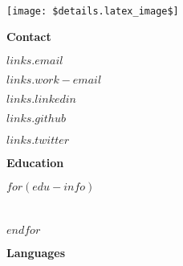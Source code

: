 \documentclass{article}
\begin{document}
    \begin{multicols}{2}
        \begin{center}
            \normalfont
            \pagecolor{maincontent}
            \vspace{12mm}
            {\huge {}}
            \vspace{10mm}\\
            \texttt{[image: \$details.latex\_image\$]} \\
        \end{center}
            \vspace{10mm}
            {\Large {\color{header}\textbf{Contact}}}
            
            \vspace{3mm}
            \textcolor{secondary}{$links.email$}
            \vspace{2mm}
            
            \textcolor{secondary}{$links.work-email$}
            \vspace{2mm}

            \textcolor{secondary}{\href{https://www.linkedin.com/in/$links.linkedin$}{$links.linkedin$}}
            \vspace{2mm}

            \textcolor{secondary}{\href{https://github.com/$links.github$}{$links.github$}}
            \vspace{2mm}

            \textcolor{secondary}{\href{$links.twitter_link$}{$links.twitter$}}
            \vspace{2mm}

            \vspace{7mm}
            {\Large {\color{header}\textbf{Education}}}

            \vspace{3mm}
            $for(edu-info)$
                \\
                \color{secondary}{$edu-info.university$}\\
                \color{secondary}{$edu-info.years$}\\
                \vspace{5mm}
            $endfor$

            \vspace{5mm}
            {\Large {\color{header}\textbf{Languages}}}


\end{multicols}
\end{document}
